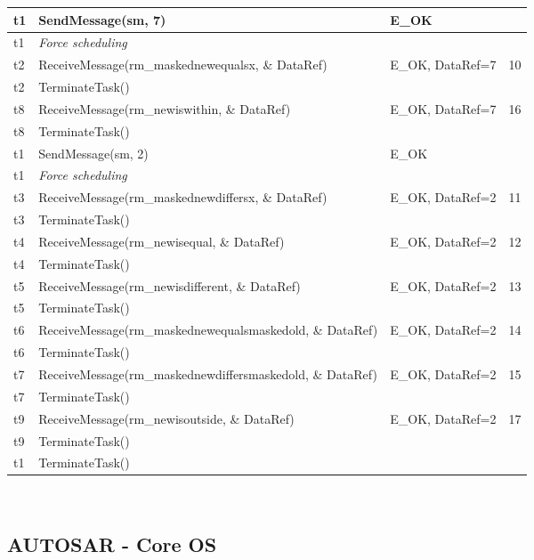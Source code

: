 \documentclass[10pt]{article}
\newlength{\Li}\settowidth{\Li}{Running}
\newlength{\Lii}\setlength{\Lii}{7cm}
\newlength{\Liiii}\setlength{\Liiii}{0.9cm}
\newlength{\Liii}\setlength{\Liii}{\textwidth} \addtolength{\Liii}{-\Li} \addtolength{\Liii}{-\Lii} \addtolength{\Liii}{-\Liiii}
\begin{document}
\begin{supertabular}{|p{\Li}|p{\Lii}|p{\Liii}|p{\Liiii}|}
	t1	& SendMessage(sm, 7)										& E\_OK				& \\ \hline
	t1	& \textit{Force scheduling}									& 					& \\ \hline
	t2	& ReceiveMessage(rm\_maskednewequalsx, \& DataRef)			& E\_OK, DataRef=7		& 10 \\ \hline
	t2	& TerminateTask()											& 					&\\ \hline
	t8	& ReceiveMessage(rm\_newiswithin, \& DataRef)					& E\_OK, DataRef=7		& 16 \\ \hline
	t8	& TerminateTask()											& 					&\\ \hline	

	t1	& SendMessage(sm, 2)										& E\_OK				& \\ \hline
	t1	& \textit{Force scheduling}									& 					& \\ \hline
	t3	& ReceiveMessage(rm\_maskednewdiffersx, \& DataRef)				& E\_OK, DataRef=2		& 11 \\ \hline
	t3	& TerminateTask()											& 					&\\ \hline	
	t4	& ReceiveMessage(rm\_newisequal, \& DataRef)					& E\_OK, DataRef=2		& 12 \\ \hline
	t4	& TerminateTask()											& 					&\\ \hline
	t5	& ReceiveMessage(rm\_newisdifferent, \& DataRef)					& E\_OK, DataRef=2		& 13 \\ \hline
	t5	& TerminateTask()											& 					&\\ \hline
	t6	& ReceiveMessage(rm\_maskednewequalsmaskedold, \& DataRef)	& E\_OK, DataRef=2		& 14 \\ \hline
	t6	& TerminateTask()											& 					&\\ \hline
	t7	& ReceiveMessage(rm\_maskednewdiffersmaskedold, \& DataRef)		& E\_OK, DataRef=2		& 15 \\ \hline
	t7	& TerminateTask()											& 					&\\ \hline	
	t9	& ReceiveMessage(rm\_newisoutside, \& DataRef)					& E\_OK, DataRef=2		& 17 \\ \hline
	t9	& TerminateTask()											& 					&\\ \hline
	t1	& TerminateTask()											& 					&\\ \hline
	\end{supertabular}\\


\subsection{AUTOSAR - Core OS}
\end{document}
